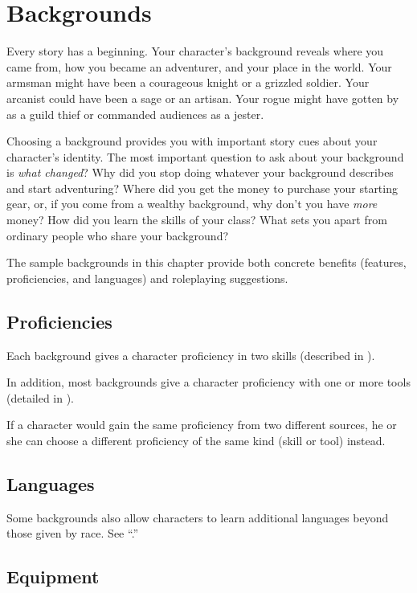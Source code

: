 \section{Backgrounds}
\label{sec:backgrounds}

Every story has a beginning. Your character's background reveals where you came from, how you became an adventurer, and your place in the world. Your armsman might have been a courageous knight or a grizzled soldier. Your arcanist could have been a sage or an artisan. Your rogue might have gotten by as a guild thief or commanded audiences as a jester.

Choosing a background provides you with important story cues about your character's identity. The most important question to ask about your background is \textit{what changed}? Why did you stop doing whatever your background describes and start adventuring? Where did you get the money to purchase your starting gear, or, if you come from a wealthy background, why don't you have \textit{more} money? How did you learn the skills of your class? What sets you apart from ordinary people who share your background?

The sample backgrounds in this chapter provide both concrete benefits (features, proficiencies, and languages) and roleplaying suggestions.

\subsection{Proficiencies}

Each background gives a character proficiency in two skills (described in ).

In addition, most backgrounds give a character proficiency with one or more tools (detailed in ).

If a character would gain the same proficiency from two different sources, he or she can choose a different proficiency of the same kind (skill or tool) instead.

\subsection{Languages}

Some backgrounds also allow characters to learn additional languages beyond those given by race. See “.”

\subsection{Equipment}


